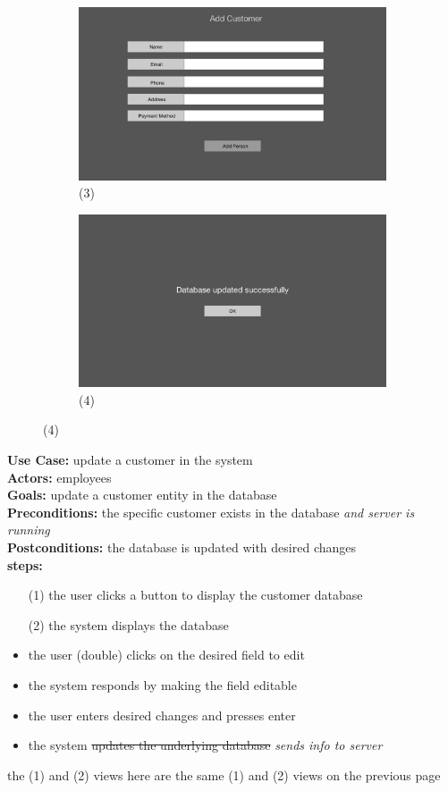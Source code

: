 \documentclass[notitlepage,11pt]{article}
\begin{document}
\begin{figure}[h]
	\begin{subfigure}{.5\textwidth}
	\centering
	\includegraphics[scale=0.12]{CustInfo}
	\caption{(3)}
	\end{subfigure}%
	\begin{subfigure}{.5\textwidth}
	\centering
	\includegraphics[scale=0.12]{Success}
	\caption{(4)}
	\end{subfigure}
\end{figure}
\newpage
\textbf{Use Case:} update a customer in the system\\
\textbf{Actors:} employees\\
\textbf{Goals:} update a customer entity in the database\\
\textbf{Preconditions:} the specific customer exists in the database \emph{and server is running}\\
\textbf{Postconditions:} the database is updated with desired changes\\
\textbf{steps:}
	\begin{itemize}
		\item[(1)] the user clicks a button to display the customer database
		\item[(2)] the system displays the database
		\item the user (double) clicks on the desired field to edit
		\item the system responds by making the field editable
		\item the user enters desired changes and presses enter
		\item the system \sout{updates the underlying database} \emph{sends info to server}
	\end{itemize}
the (1) and (2) views here are the same (1) and (2) views on the previous page
\end{document}
